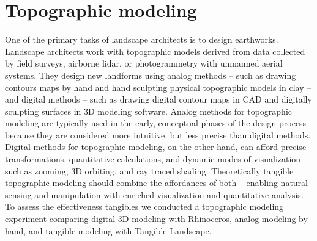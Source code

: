 \documentclass[Afour,sagev,times]{sagej} %
\begin{document}
\section{Topographic modeling}
%
One of the primary tasks of landscape architects is to design earthworks.
\cite{Petschek2008,Strom2013}
Landscape architects work with topographic models 
derived from data collected by field surveys, airborne lidar, 
or photogrammetry with unmanned aerial systems.
They design new landforms 
using analog methods -- such as 
drawing contours maps by hand and
hand sculpting physical topographic models in clay --
and digital methods -- such as 
drawing digital contour maps in CAD and
digitally sculpting surfaces in 3D modeling software. 
Analog methods for topographic modeling are typically used 
in the early, conceptual phases of the design process because 
they are considered more intuitive, but less precise than digital methods.
Digital methods for topographic modeling, on the other hand, 
can afford precise transformations, 
quantitative calculations, 
and dynamic modes of visualization such as 
zooming, 3D orbiting, and ray traced shading.
Theoretically tangible topographic modeling 
should combine the affordances of both -- 
enabling natural sensing and manipulation
with enriched visualization and quantitative analysis.
To assess the effectiveness tangibles
we conducted a topographic modeling experiment
comparing 
digital 3D modeling with Rhinoceros, 
analog modeling by hand, 
and tangible modeling with Tangible Landscape. 
\end{document}
